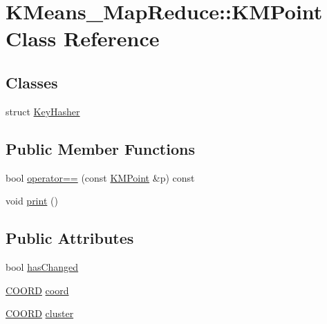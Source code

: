 \hypertarget{classKMeans__MapReduce_1_1KMPoint}{\section{K\-Means\-\_\-\-Map\-Reduce\-:\-:K\-M\-Point Class Reference}
\label{classKMeans__MapReduce_1_1KMPoint}
}
\subsection*{Classes}
\begin{DoxyCompactItemize}
\item 
struct \hyperlink{structKMeans__MapReduce_1_1KMPoint_1_1KeyHasher}{Key\-Hasher}
\end{DoxyCompactItemize}
\subsection*{Public Member Functions}
\begin{DoxyCompactItemize}
\item 
bool \hyperlink{classKMeans__MapReduce_1_1KMPoint_a84aabb3b332a8693a0434d3be241c24b}{operator==} (const \hyperlink{classKMeans__MapReduce_1_1KMPoint}{K\-M\-Point} \&p) const 
\item 
void \hyperlink{classKMeans__MapReduce_1_1KMPoint_ada19b5facd309f71eeaa2dc5cacb051e}{print} ()
\end{DoxyCompactItemize}
\subsection*{Public Attributes}
\begin{DoxyCompactItemize}
\item 
bool \hyperlink{classKMeans__MapReduce_1_1KMPoint_a41e063ff13aab49111c9110f9f8c9f5f}{has\-Changed}
\item 
\hyperlink{namespaceKMeans__MapReduce_a8dfbbc4a186c8ea8ae691f4a85db53e3}{C\-O\-O\-R\-D} \hyperlink{classKMeans__MapReduce_1_1KMPoint_ac824c320dce8a7a73e6e24a1fb116b69}{coord}
\item 
\hyperlink{namespaceKMeans__MapReduce_a8dfbbc4a186c8ea8ae691f4a85db53e3}{C\-O\-O\-R\-D} \hyperlink{classKMeans__MapReduce_1_1KMPoint_ab0bfe9fb7282a263de59729e3bc0542e}{cluster}
\end{DoxyCompactItemize}


